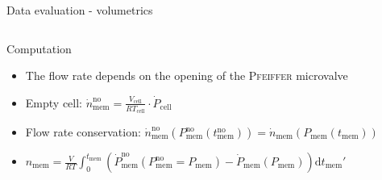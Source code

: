 \documentclass[../defence.tex]{subfiles}
\begin{document}
\begin{frame}{Data evaluation - volumetrics}
\begin{columns}[onlytextwidth, T]
        \begin{block}{Computation}
          \begin{tiny}
            \begin{itemize}
              \item The flow rate depends on the opening of the \textsc{Pfeiffer} microvalve
              \pause

              \item Empty cell: $\dot{n}^\mathrm{no}_\mathrm{mem}=\frac{V_\mathrm{cell}}{RT_\mathrm{cell}}\cdot\dot{P}_\mathrm{cell}$
              \pause

              \item Flow rate conservation: $\dot{n}_\mathrm{mem}^\mathrm{no}(P_\mathrm{mem}^\mathrm{no}(t_\mathrm{mem}^\mathrm{no}))=\dot{n}_\mathrm{mem}(P_\mathrm{mem}(t_\mathrm{mem}))$
              \pause

              \item $n_\mathrm{mem}=\frac{V}{RT}\int^{t_\mathrm{mem}}_{0} \left( \dot{P}_\mathrm{mem}^\mathrm{no}(P_\mathrm{mem}^\mathrm{no}=P_\mathrm{mem}) - \dot{P}_\mathrm{mem}(P_\mathrm{mem}) \right)\mathrm{d}t_\mathrm{mem}'$

            \end{itemize}
          \end{tiny}
        \end{block}
        \pause


\end{columns}
\end{frame}
\end{document}
